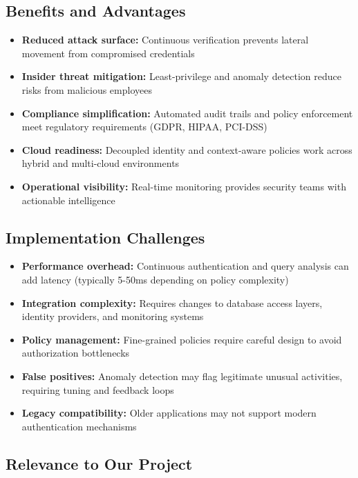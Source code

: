 \subsection{Benefits and Advantages}

\begin{itemize}
    \item \textbf{Reduced attack surface:} Continuous verification prevents lateral movement from compromised credentials
    \item \textbf{Insider threat mitigation:} Least-privilege and anomaly detection reduce risks from malicious employees
    \item \textbf{Compliance simplification:} Automated audit trails and policy enforcement meet regulatory requirements (GDPR, HIPAA, PCI-DSS)
    \item \textbf{Cloud readiness:} Decoupled identity and context-aware policies work across hybrid and multi-cloud environments
    \item \textbf{Operational visibility:} Real-time monitoring provides security teams with actionable intelligence
\end{itemize}

\subsection{Implementation Challenges}

\begin{itemize}
    \item \textbf{Performance overhead:} Continuous authentication and query analysis can add latency (typically 5-50ms depending on policy complexity)
    \item \textbf{Integration complexity:} Requires changes to database access layers, identity providers, and monitoring systems
    \item \textbf{Policy management:} Fine-grained policies require careful design to avoid authorization bottlenecks
    \item \textbf{False positives:} Anomaly detection may flag legitimate unusual activities, requiring tuning and feedback loops
    \item \textbf{Legacy compatibility:} Older applications may not support modern authentication mechanisms
\end{itemize}

\subsection{Relevance to Our Project}

